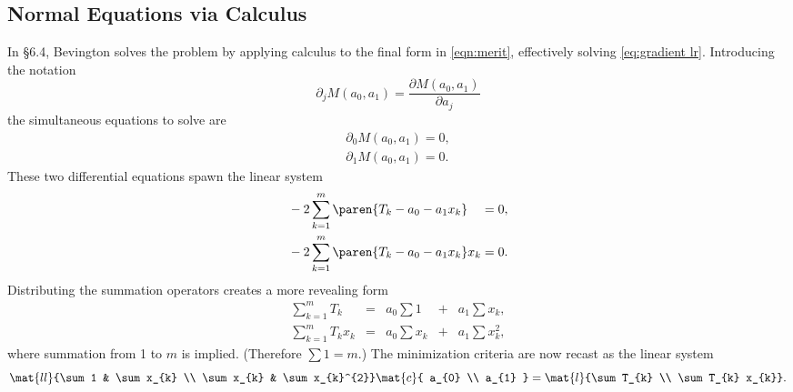 \subsection{\label{sec:normal I}Normal Equations via Calculus}  %
In \S 6.4, Bevington solves the problem by applying calculus to the final form in \eqref{eqn:merit}, effectively solving \eqref{eq:gradient lr}. Introducing the notation
  \begin{equation*}   %
       \partial_{j} M (a_{0}, a_{1}) = \frac{\partial M(a_{0}, a_{1})}{\partial a_{j}}
  \end{equation*}
the simultaneous equations to solve are
  \begin{equation}   %
    \begin{split}
       \partial_{0} M (a_{0}, a_{1}) = 0 , \\
       \partial_{1} M (a_{0}, a_{1}) = 0 .
    \label{eq:bev pde}
    \end{split}
  \end{equation}
These two differential equations spawn the linear system
\begin{equation*}
  \begin{split}
    &-2 \sum_{k=1}^{m} \paren{T_{k} - a_{0} - a_{1}x_{k}} \phantom{x_{k}} = 0, \\
    &-2 \sum_{k=1}^{m} \paren{T_{k} - a_{0} - a_{1}x_{k}} x_{k}  = 0.
  \end{split}
\end{equation*}
Distributing the summation operators creates a more revealing form  \\[-5pt]
  \begin{equation*}   %
  \begin{array}{lclclcl}
    \sum\limits_{k=1}^{m} T_{k}       & = & a_{0} \sum 1     & + & a_{1} \sum x_{k}, \\
    \sum\limits_{k=1}^{m} T_{k} x_{k} & = & a_{0} \sum x_{k} & + & a_{1} \sum x_{k}^{2}, 
  \end{array}
  \end{equation*}
where summation from 1 to $m$ is implied. (Therefore $\sum 1 = m$.) The minimization criteria are
now recast as the linear system
  \begin{equation}   %
      \mat{ll}{\sum 1 & \sum x_{k} \\ \sum x_{k} & \sum x_{k}^{2}}
      \mat{c}{ a_{0} \\ a_{1} } = 
      \mat{l}{\sum T_{k} \\ \sum T_{k} x_{k}}.
    \label{eq:modal matrix eq}
  \end{equation}

